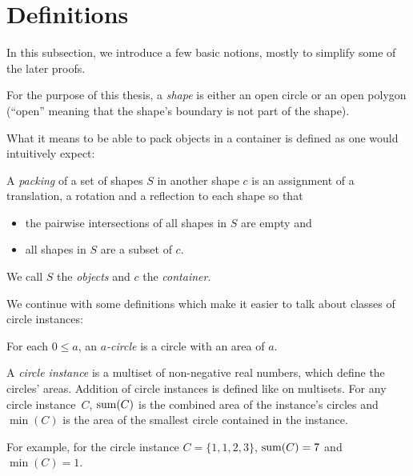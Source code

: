 \documentclass[a4paper,style=print,bibliography=totoc,nexus,lnum,extramargin]{tubsbook}
\begin{document}
\section{Definitions}

In this subsection, we introduce a few basic notions, mostly to simplify some of the later proofs.

\begin{definition}
    For the purpose of this thesis, a \emph{shape} is either an open circle or an open polygon (“open” meaning that the shape's boundary is not part of the shape).
\end{definition}

What it means to be able to pack objects in a container is defined as one would intuitively expect:

\begin{definition}
    A \emph{packing} of a set of shapes $S$ in another shape $c$ is an assignment of a translation, a rotation and a reflection to each shape so that

    \begin{itemize}
        \item the pairwise intersections of all shapes in $S$ are empty and
        \item all shapes in $S$ are a subset of $c$.
    \end{itemize}

    We call $S$ the \emph{objects} and $c$ the \emph{container}.
\end{definition}

We continue with some definitions which make it easier to talk about classes of circle instances:

\begin{definition}
    For each $0 \le a$, an \emph{$a$-circle} is a circle with an area of $a$.
\end{definition}

\begin{definition}
    A \emph{circle instance} is a multiset of non-negative real numbers, which define the circles' areas. Addition of circle instances is defined like on multisets.
    For any circle instance~$C$, $\operatorname{sum}(C)$ is the combined area of the instance's circles and $\min(C)$ is the area of the smallest circle contained in the instance.
\end{definition}

For example, for the circle instance $C = \{1,1,2,3\}$, $\operatorname{sum}(C) = 7$ and $\min(C) = 1$.
\end{document}
